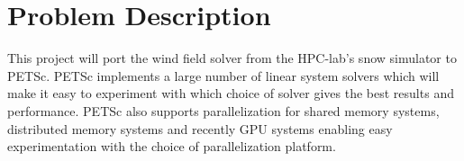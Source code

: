 \section*{Problem Description}

This project will port the wind field solver from the HPC-lab's snow simulator to 
PETSc. PETSc implements a large number of linear system solvers which will make 
it easy to experiment with which choice of solver gives the best results and 
performance. PETSc also supports parallelization for shared memory systems, 
distributed memory systems and recently GPU systems enabling easy experimentation 
with the choice of parallelization platform. 